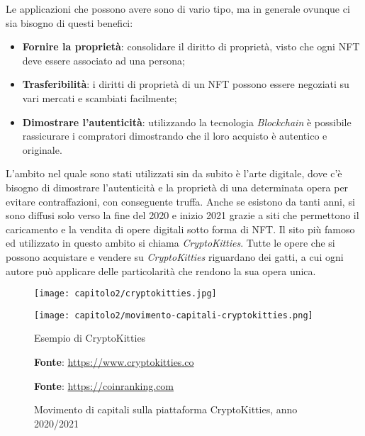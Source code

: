 \noindent Le applicazioni che possono avere sono di vario tipo, ma in generale ovunque ci sia bisogno di questi benefici:
\begin{itemize}
  \item \textbf{Fornire la proprietà}: consolidare il diritto di proprietà, visto che ogni NFT deve essere associato ad una persona;
  \item \textbf{Trasferibilità}: i diritti di proprietà di un NFT possono essere negoziati su vari mercati e scambiati facilmente;
  \item \textbf{Dimostrare l'autenticità}: utilizzando la tecnologia \textit{Blockchain} è possibile rassicurare i compratori dimostrando che il loro acquisto è autentico e originale.
\end{itemize}

L'ambito nel quale sono stati utilizzati sin da subito è l'arte digitale, dove c'è bisogno di dimostrare l'autenticità e la proprietà di una determinata opera per evitare contraffazioni, con conseguente truffa.
Anche se esistono da tanti anni, si sono diffusi solo verso la fine del 2020 e inizio 2021 grazie a siti che permettono il caricamento e la vendita di opere digitali sotto forma di NFT. Il sito più famoso ed utilizzato in questo ambito si chiama \textit{CryptoKitties}. Tutte le opere che si possono acquistare e vendere su \textit{CryptoKitties} riguardano dei gatti, a cui ogni autore può applicare delle particolarità che rendono la sua opera unica.

\begin{figure}[!tbph]
  \captionsetup{singlelinecheck = false, format= hang, justification=raggedright, font=footnotesize, labelsep=space}

  \centering

  \begin{minipage}{0.5\textwidth}
    \texttt{[image: capitolo2/cryptokitties.jpg]}
  \end{minipage}%
  \begin{minipage}{0.5\textwidth}
    \texttt{[image: capitolo2/movimento-capitali-cryptokitties.png]}
  \end{minipage}

  \begin{minipage}[t]{0.5\textwidth}
    \caption{Esempio di CryptoKitties}
    \textbf{Fonte}: \href{https://www.cryptokitties.co}{https://www.cryptokitties.co}
  \end{minipage}%
  \begin{minipage}[t]{0.5\textwidth}
    \caption{Movimento di capitali sulla piattaforma CryptoKitties, anno 2020/2021}
    \textbf{Fonte}: \href{https://coinranking.com/dapp/cryptokitties}{https://coinranking.com}
  \end{minipage}
\end{figure}

